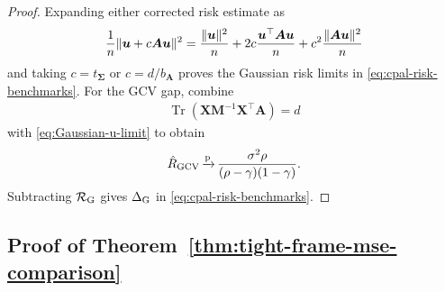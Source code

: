 \documentclass{article}
\theoremstyle{plain}
\theoremstyle{definition}
\theoremstyle{definition}
\DeclarePairedDelimiter\norm{\lVert}{\rVert}
\newcommand{\limp}{{\,\smash{\xrightarrow{\mathrm{p}}}}\,}
\DeclareMathOperator{\trace}{Tr}
\def\mathbold{\boldsymbol}
\def\cal{\mathcal}
\def\bA{\mathbold{A}}\def\calA{{\cal A}}\def\scrA{{\mathscr A}}\def\Ahat{\widehat{A}}\def\Atil{{\widetilde A}}
\def\bM{\mathbold{M}}\def\hbM{{\widehat{\bM}}}\def\tbM{{\widetilde{\bM}}}
\def\calR{{\cal R}}\def\scrR{{\mathscr R}}\def\Rhat{\widehat{R}}\def\Rtil{{\widetilde R}}\def\Rbar{{\overline R}}
\def\bu{\mathbold{u}}\def\uhat{\widehat{u}}\def\util{\widetilde{u}}\def\ubar{{\overline u}}
\def\bX{\mathbold{X}}\def\hbX{{\widehat{\bX}}}\def\tbX{{\tilde{\bX}}}\def\bXbar{{\overline \bX}}
\def\bSigma{\mathbold{\Sigma}}\def\hbSigma{{\widehat{\bSigma}}}
\newcommand{\GCV}{{\text{GCV}}}
\newcommand{\hR}{\hat{R}}
\begin{document}
\begin{proof}
Expanding either corrected risk estimate as
\begin{align*}
    \frac1n\norm{\bu+c\bA\bu}^2
    =\frac{\norm{\bu}^2}{n}
     +2c\frac{\bu^\top\bA\bu}{n}
     +c^2\frac{\norm{\bA\bu}^2}{n}
\end{align*}
and taking $c=t_{\bSigma}$ or $c=d/b_{\bA}$ proves the Gaussian
risk limits in \eqref{eq:cpal-risk-benchmarks}. For the GCV gap, combine
\begin{align*}
    \trace(\bX\bM^{-1}\bX^\top\bA)=d
\end{align*}
with \eqref{eq:Gaussian-u-limit} to obtain
\begin{align*}
    \hR_{\GCV}
    \limp
    \frac{\sigma^2\rho}{(\rho-\gamma)(1-\gamma)}.
\end{align*}
Subtracting $\calR_{\rm G}$ gives $\Delta_{\rm G}$ in
\eqref{eq:cpal-risk-benchmarks}.
\end{proof}

\subsection{Proof of Theorem~\ref{thm:tight-frame-mse-comparison}}
\label{app:proof-tight-frame-mse-comparison}
\end{document}
